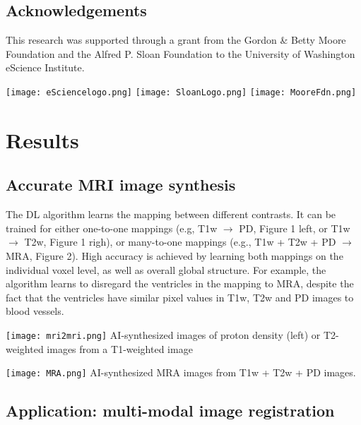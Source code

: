 \documentclass[a0, portrait]{a0poster}
\begin{document}
\begin{multicols}{2}
\subsection*{Acknowledgements} \footnotesize This research was supported through
a grant from the Gordon \& Betty Moore Foundation and the Alfred P. Sloan
Foundation to the University of Washington eScience Institute.

\texttt{[image: eSciencelogo.png]}
\texttt{[image: SloanLogo.png]}
\texttt{[image: MooreFdn.png]}

\columnbreak

\color{Navy}
\section*{Results}
\subsection*{Accurate MRI image synthesis}
The DL algorithm learns the mapping between different contrasts. It can be trained for either one-to-one mappings (e.g, T1w $\rightarrow$ PD, Figure 1 left, or T1w $\rightarrow$ T2w, Figure 1 righ), or many-to-one mappings (e.g., T1w + T2w + PD $\rightarrow$ MRA, Figure 2). High accuracy is achieved by learning both mappings on the individual voxel level, as well as overall global structure. For example, the algorithm learns to disregard the ventricles in the mapping to MRA, despite the fact that the ventricles have similar pixel values in T1w, T2w and PD images to blood vessels.

\begin{minipage}[b]{1.0\linewidth}
  \texttt{[image: mri2mri.png]}
  \center AI-synthesized images of proton density (left) or T2-weighted images from a T1-weighted image
\end{minipage}

\begin{minipage}[t]{0.8\linewidth}
    \texttt{[image: MRA.png]}
    \center AI-synthesized MRA images from T1w + T2w + PD images.
\end{minipage}

\subsection*{Application: multi-modal image registration}


\end{multicols}
\end{document}
